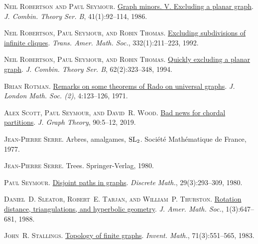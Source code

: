 \documentclass[a4paper,11pt]{article}
\theoremstyle{plain}
\theoremstyle{definition}
\begin{document}
\textsc{Neil Robertson and Paul Seymour}.
\newblock \href{https://doi.org/10.1016/0095-8956(86)90030-4}{Graph minors.
  {V}. {E}xcluding a planar graph}.
\newblock \emph{J. Combin. Theory Ser. B}, 41(1):92--114, 1986{}.

\textsc{Neil Robertson, Paul Seymour, and Robin Thomas}.
\newblock \href{https://doi.org/10.2307/2154029}{Excluding subdivisions of
  infinite cliques}.
\newblock \emph{Trans. Amer. Math. Soc.}, 332(1):211--223, 1992.

\textsc{Neil Robertson, Paul Seymour, and Robin Thomas}.
\newblock \href{https://doi.org/10.1006/jctb.1994.1073}{Quickly excluding a
  planar graph}.
\newblock \emph{J. Combin. Theory Ser. B}, 62(2):323--348, 1994.

\textsc{Brian Rotman}.
\newblock \href{https://doi.org/10.1112/jlms/s2-4.1.123}{Remarks on some
  theorems of {R}ado on universal graphs}.
\newblock \emph{J. London Math. Soc. (2)}, 4:123--126, 1971.

\textsc{Alex Scott, Paul Seymour, and David~R. Wood}.
\newblock \href{https://doi.org/10.1002/jgt.22363}{Bad news for chordal
  partitions}.
\newblock \emph{J. Graph Theory}, 90:5--12, 2019.

\textsc{Jean-Pierre Serre}.
\newblock Arbres, amalgames, {${\rm SL}_{2}$}.
\newblock Soci\'{e}t\'{e} Math\'{e}matique de France, 1977.

\textsc{Jean-Pierre Serre}.
\newblock Trees.
\newblock Springer-Verlag, 1980.

\textsc{Paul Seymour}.
\newblock \href{https://doi.org/10.1016/0012-365X(80)90158-2}{Disjoint paths in
  graphs}.
\newblock \emph{Discrete Math.}, 29(3):293--309, 1980.

\textsc{Daniel~D. Sleator, Robert~E. Tarjan, and William~P. Thurston}.
\newblock \href{https://doi.org/10.1090/S0894-0347-1988-0928904-4}{Rotation
  distance, triangulations, and hyperbolic geometry}.
\newblock \emph{J. Amer. Math. Soc.}, 1(3):647--681, 1988.

\textsc{John~R. Stallings}.
\newblock \href{https://doi.org/10.1007/BF02095993}{Topology of finite graphs}.
\newblock \emph{Invent. Math.}, 71(3):551--565, 1983.
\end{document}
